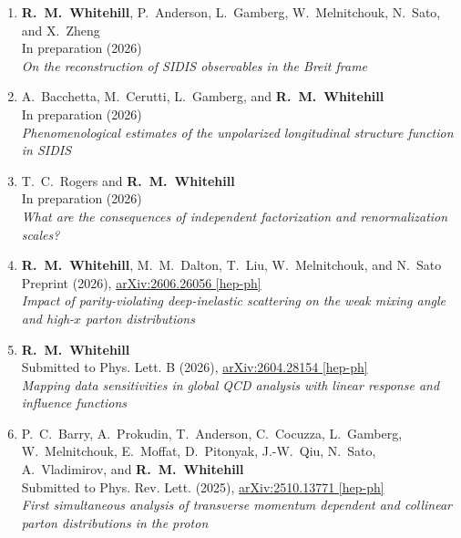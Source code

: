 \begin{enumerate}[leftmargin=*]

    \item \textbf{R.~M.~Whitehill}, P.~Anderson, L.~Gamberg, W.~Melnitchouk, N.~Sato, and X.~Zheng \\
    In preparation (2026) \\
    \textit{On the reconstruction of SIDIS observables in the Breit frame}

    \item A.~Bacchetta, M.~Cerutti, L.~Gamberg, and \textbf{R.~M.~Whitehill} \\
    In preparation (2026) \\
    \textit{Phenomenological estimates of the unpolarized longitudinal structure function in SIDIS}

    \item T.~C.~Rogers and \textbf{R.~M.~Whitehill} \\
    In preparation (2026) \\
    \textit{What are the consequences of independent factorization and renormalization scales?}

    \item \textbf{R.~M.~Whitehill}, M.~M.~Dalton, T.~Liu, W.~Melnitchouk, and N.~Sato \\
    Preprint (2026), \href{https://arxiv.org/abs/2606.26056}{arXiv:2606.26056 [hep-ph]} \\
    \textit{Impact of parity-violating deep-inelastic scattering on the weak mixing angle and high-$x$ parton distributions}

    \item \textbf{R.~M.~Whitehill} \\
    Submitted to Phys. Lett. B (2026), \href{https://arxiv.org/abs/2604.28154}{arXiv:2604.28154 [hep-ph]} \\
    \textit{Mapping data sensitivities in global QCD analysis with linear response and influence functions}

    \item P.~C.~Barry, A.~Prokudin, T.~Anderson, C.~Cocuzza, L.~Gamberg, W.~Melnitchouk, E.~Moffat, D.~Pitonyak, J.-W.~Qiu, N.~Sato, A.~Vladimirov, and \textbf{R.~M.~Whitehill} \\
    Submitted to Phys. Rev. Lett. (2025), \href{https://arxiv.org/abs/2510.13771}{arXiv:2510.13771 [hep-ph]} \\
    \textit{First simultaneous analysis of transverse momentum dependent and collinear parton distributions in the proton}


\end{enumerate}
